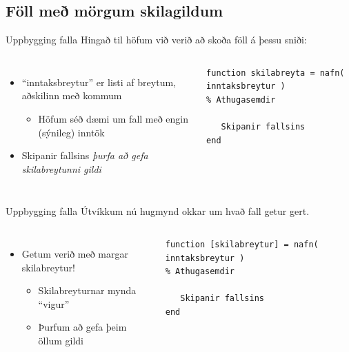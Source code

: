 \documentclass{beamer}
\begin{document}
\subsection{Föll með mörgum skilagildum}
\begin{frame}[fragile]{Uppbygging falla}
\vspace{\baselineskip}
Hingað til höfum við verið að skoða föll á þessu sniði:
\begin{columns}
\begin{itemize}
 \item ``inntaksbreytur'' er listi af breytum, aðskilinn með kommum
 \begin{itemize}
  \item Höfum séð dæmi um fall með engin (sýnileg) inntök
 \end{itemize}
 \item Skipanir fallsins \emph{þurfa að gefa skilabreytunni gildi}
\end{itemize}
\begin{verbatim}
function skilabreyta = nafn( inntaksbreytur )
% Athugasemdir

   Skipanir fallsins
end 
\end{verbatim}
\end{columns}
\end{frame}

\begin{frame}[fragile]{Uppbygging falla}
\vspace{\baselineskip}
Útvíkkum nú hugmynd okkar um hvað fall getur gert.
\begin{columns}
\begin{itemize}
 \item Getum verið með margar skilabreytur!
 \begin{itemize}
  \item Skilabreyturnar mynda ``vigur''
  \item Þurfum að gefa þeim öllum gildi
 \end{itemize}
\end{itemize}
\begin{verbatim}
function [skilabreytur] = nafn( inntaksbreytur )
% Athugasemdir

   Skipanir fallsins
end 
\end{verbatim}
\end{columns}
\end{frame}
\end{document}
